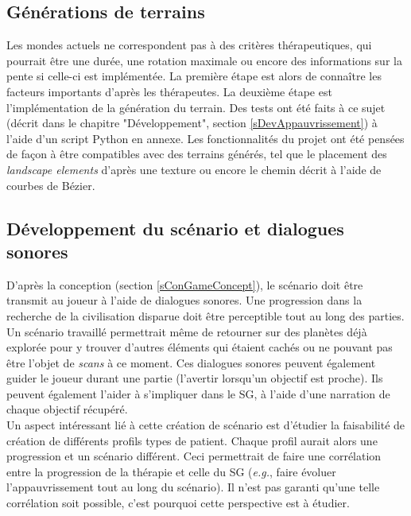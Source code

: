 	\subsection*{Générations de terrains} 
		Les mondes actuels ne correspondent pas à des critères thérapeutiques, qui pourrait être une durée, une rotation maximale ou encore des informations sur la pente si celle-ci est implémentée. La première étape est alors de connaître les facteurs importants d'après les thérapeutes. La deuxième étape est l'implémentation de la génération du terrain. Des tests ont été faits à ce sujet (décrit dans le chapitre "Développement", section \ref{sDevAppauvrissement}) à l'aide d'un script Python \cite{python_website} en annexe. Les fonctionnalités du projet ont été pensées de façon à être compatibles avec des terrains générés, tel que le placement des \textit{landscape elements} d'après une texture ou encore le chemin décrit à l'aide de courbes de Bézier.
	
	\subsection*{Développement du scénario et dialogues sonores}
		D'après la conception (section \ref{sConGameConcept}), le scénario doit être transmit au joueur à l'aide de dialogues sonores. Une progression dans la recherche de la civilisation disparue doit être perceptible tout au long des parties. Un scénario travaillé permettrait même de retourner sur des planètes déjà explorée pour y trouver d'autres éléments qui étaient cachés ou ne pouvant pas être l'objet de \textit{scans} à ce moment.
		Ces dialogues sonores peuvent également guider le joueur durant une partie (l'avertir lorsqu'un objectif est proche). Ils peuvent également l'aider à s'impliquer dans le SG, à l'aide d'une narration de chaque objectif récupéré.
		\\
		
		Un aspect intéressant lié à cette création de scénario est d'étudier la faisabilité de création de différents profils types de patient. Chaque profil aurait alors une progression et un scénario différent. Ceci permettrait de faire une corrélation entre la progression de la thérapie et celle du SG (\textit{e.g.}, faire évoluer l'appauvrissement tout au long du scénario). Il n'est pas garanti qu'une telle corrélation soit possible, c'est pourquoi cette perspective est à étudier.
		
